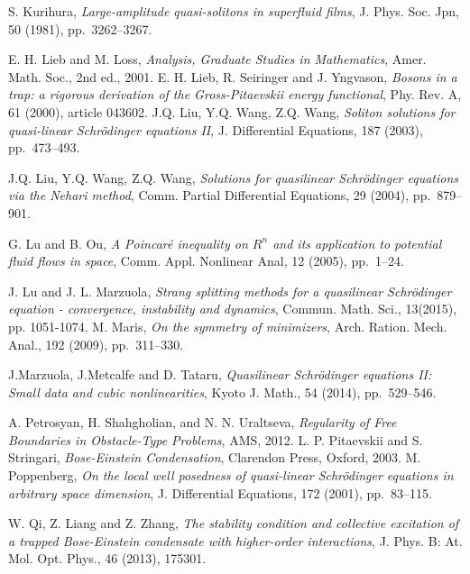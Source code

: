 \documentclass{elsarticle}
\begin{document}
\begin{thebibliography}{}
{\sc S. Kurihura},
\textit{Large-amplitude quasi-solitons in superfluid films},
J. Phys. Soc. Jpn, 50 (1981), pp.~3262--3267.




{\sc E. H. Lieb and M. Loss},
\textit{Analysis, Graduate Studies in Mathematics}, Amer. Math.
Soc., 2nd ed., 2001.
{\sc E. H. Lieb, R. Seiringer and J. Yngvason}, \textit{Bosons in a
trap: a rigorous derivation of the Gross-Pitaevskii energy
functional}, Phy. Rev. A,  61 (2000), article 043602.
{\sc J.Q. Liu, Y.Q. Wang, Z.Q. Wang},
\textit{Soliton solutions for quasi-linear Schr\"odinger equations
II},
J. Differential Equations, 187 (2003), pp.~473--493.

{\sc J.Q. Liu, Y.Q. Wang, Z.Q. Wang},
\textit{Solutions for quasilinear Schr\"odinger equations via the Nehari method},
Comm. Partial Differential Equations, 29 (2004), pp.~879--901.

{\sc G. Lu  and B. Ou},
\textit{A Poincar{\'e} inequality on $R^n$ and its application to potential fluid flows in space},
Comm. Appl. Nonlinear Anal, 12 (2005), pp.~1--24.

{\sc J. Lu and J. L. Marzuola},
\textit{Strang splitting methods for a quasilinear Schr\"odinger equation - convergence, instability and dynamics}, Commun. Math. Sci.,
13(2015), pp. 1051-1074.
{\sc M. Maris},
\textit{On the symmetry of minimizers},
Arch. Ration. Mech. Anal.,  192 (2009), pp.~311--330.

{\sc J.Marzuola, J.Metcalfe and D. Tataru},
\textit{Quasilinear Schr\"odinger equations II: Small data and cubic nonlinearities},
 Kyoto J. Math., 54 (2014), pp.~529--546.

{\sc A. Petrosyan, H. Shahgholian, and N. N. Uraltseva},
 \textit{Regularity of Free
Boundaries in Obstacle-Type Problems}, AMS, 2012.
{\sc L. P. Pitaevskii and S. Stringari},
\textit{Bose-Einstein Condensation},
Clarendon Press, Oxford, 2003.
{\sc M. Poppenberg},
\textit{On the local well posedness of quasi-linear Schr\"odinger equations in arbitrary
space dimension},
J. Differential Equations, 172 (2001), pp.~83--115.

{\sc W. Qi, Z. Liang and Z. Zhang},
\textit{The stability condition and collective
excitation of a trapped Bose-Einstein
condensate with higher-order interactions},
J. Phys. B: At. Mol. Opt. Phys., 46 (2013), 175301.


\end{thebibliography}
\end{document}
